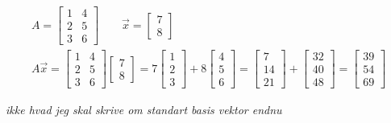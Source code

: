 \begin{eks}
\begin{align*}
A=
\begin{bmatrix}
1 & 4\\
2 & 5\\
3 & 6
\end{bmatrix}
\qquad
\vec{x}=
\begin{bmatrix}
7\\
8
\end{bmatrix} \\
A\vec{x}= \begin{bmatrix}
1 & 4\\
2 & 5\\
3 & 6
\end{bmatrix}
\begin{bmatrix}
7\\
8
\end{bmatrix}
=
7
\begin{bmatrix}
1\\
2\\
3
\end{bmatrix}
+ 8
\begin{bmatrix}
4\\
5\\
6
\end{bmatrix}=
\begin{bmatrix}
7\\
14\\
21
\end{bmatrix}
+
\begin{bmatrix}
32\\
40\\
48
\end{bmatrix}
=
\begin{bmatrix}
39\\
54\\
69
\end{bmatrix}
\end{align*}
\end{eks}
\textit{ikke hvad jeg skal skrive om standart basis vektor endnu}
